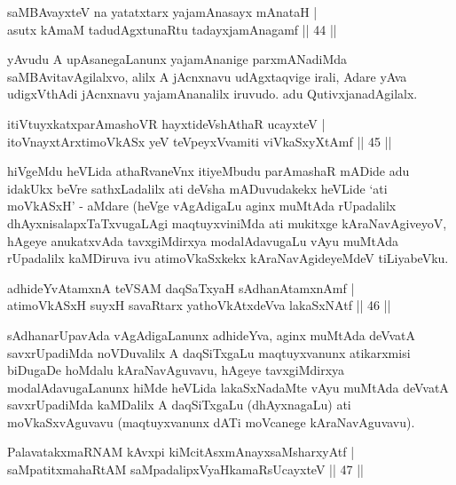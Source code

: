 \begin{shl}
saMBAvayxteV na yatatxtarx yajamAnasayx mAnataH |\\
asutx kAmaM tadudAgxtunaRtu tadayxjamAnagamf \hfill || 44 ||
\end{shl}

\begin{artha}
yAvudu A upAsanegaLanunx yajamAnanige parxmANadiMda saMBAvitavAgilalxvo, alilx A jAcnxnavu udAgxtaqvige irali, Adare yAva udigxVthAdi jAcnxnavu yajamAnanalilx iruvudo. adu QutivxjanadAgilalx.
\end{artha}

\begin{shl}
itiVtuyxkatxparAmashoVR hayxtideVshAthaR ucayxteV |\\
itoV\s nayxtArxtimoVkASx yeV teV\s peyxVvamiti viVkaSxyXtAmf \hfill || 45 ||
\end{shl}

\begin{artha}
hiVgeMdu heVLida athaRvaneVnx itiyeMbudu parAmashaR mADide adu idakUkx beVre sathxLadalilx ati deVsha mADuvudakekx heVLide `ati moVkASxH' - aMdare (heVge vAgAdigaLu aginx muMtAda rUpadalilx dhAyxnisalapxTaTxvugaLAgi maqtuyxviniMda ati mukitxge kAraNavAgiveyoV, hAgeye anukatxvAda tavxgiMdirxya modalAdavugaLu vAyu muMtAda rUpadalilx kaMDiruva ivu atimoVkaSxkekx kAraNavAgideyeMdeV tiLiyabeVku.
\end{artha}


\begin{shl}
adhideYvAtamxnA teVSAM daqSaTxyaH sAdhanAtamxnAmf |\\
atimoVkASxH suyxH savaRtarx yathoVkAtxdeVva lakaSxNAtf \hfill || 46 ||
\end{shl}

\begin{artha}
sAdhanarUpavAda vAgAdigaLanunx adhideYva, aginx muMtAda deVvatA savxrUpadiMda noVDuvalilx A daqSiTxgaLu maqtuyxvanunx atikarxmisi biDugaDe hoMdalu kAraNavAguvavu, hAgeye tavxgiMdirxya modalAdavugaLanunx hiMde heVLida lakaSxNadaMte vAyu muMtAda deVvatA savxrUpadiMda kaMDalilx A daqSiTxgaLu (dhAyxnagaLu) ati moVkaSxvAguvavu (maqtuyxvanunx dATi moVcanege kAraNavAguvavu).
\end{artha}


\begin{shl}
PalavatakxmaRNAM kAvxpi kiMcitAsxmAnayxsaMsharxyAtf |\\
saMpatitxmahaRtAM saMpadalipxVyaHkamaRsUcayxteV \hfill || 47 ||
\end{shl}

